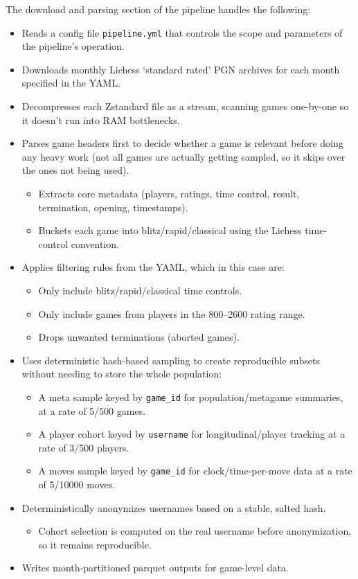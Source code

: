\documentclass[
  12pt]{article}
\providecommand{\tightlist}{%
  \setlength{\itemsep}{0pt}\setlength{\parskip}{0pt}}\usepackage{longtable,booktabs,array}
\begin{document}
The download and parsing section of the pipeline handles the following:

\begin{itemize}
\tightlist
\item
  Reads a config file \texttt{pipeline.yml} that controls the scope and
  parameters of the pipeline's operation.
\item
  Downloads monthly Lichess `standard rated' PGN archives for each month
  specified in the YAML.
\item
  Decompresses each Zstandard file as a stream, scanning games
  one-by-one so it doesn't run into RAM bottlenecks.
\item
  Parses game headers first to decide whether a game is relevant before
  doing any heavy work (not all games are actually getting sampled, so
  it skips over the ones not being used).

  \begin{itemize}
  \tightlist
  \item
    Extracts core metadata (players, ratings, time control, result,
    termination, opening, timestamps).
  \item
    Buckets each game into blitz/rapid/classical using the Lichess
    time-control convention.
  \end{itemize}
\item
  Applies filtering rules from the YAML, which in this case are:

  \begin{itemize}
  \tightlist
  \item
    Only include blitz/rapid/classical time controls.
  \item
    Only include games from players in the 800--2600 rating range.
  \item
    Drops unwanted terminations (aborted games).
  \end{itemize}
\item
  Uses deterministic hash-based sampling to create reproducible subsets
  without needing to store the whole population:

  \begin{itemize}
  \tightlist
  \item
    A meta sample keyed by \texttt{game\_id} for population/metagame
    summaries, at a rate of 5/500 games.
  \item
    A player cohort keyed by \texttt{username} for longitudinal/player
    tracking at a rate of 3/500 players.
  \item
    A moves sample keyed by \texttt{game\_id} for clock/time-per-move
    data at a rate of 5/10000 moves.
  \end{itemize}
\item
  Deterministically anonymizes usernames based on a stable, salted hash.

  \begin{itemize}
  \tightlist
  \item
    Cohort selection is computed on the real username before
    anonymization, so it remains reproducible.
  \end{itemize}
\item
  Writes month-partitioned parquet outputs for game-level data.
\end{itemize}
\end{document}
